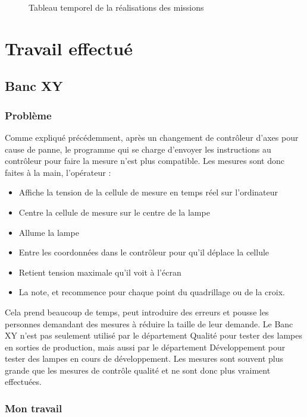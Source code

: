 \documentclass[12pt]{article}
\begin{document}
\begin{figure}[h]
	\centering
	\caption{Tableau temporel de la réalisations des missions}
	\label{fig:planning}
\end{figure}
\newpage

\section{Travail effectué}

\subsection{Banc XY}

\subsubsection{Problème}

Comme expliqué précédemment, après un changement de contrôleur d'axes pour cause de panne, le programme qui se charge d'envoyer les instructions au contrôleur pour faire la mesure n'est plus compatible.
Les mesures sont donc faites à la main, l'opérateur :
\begin{itemize}
		\label{etapesMesureBancXY}

	\item Affiche la tension de la cellule de mesure en temps réel sur l'ordinateur
	\item Centre la cellule de mesure sur le centre de la lampe
	\item Allume la lampe
	\item Entre les coordonnées dans le contrôleur pour qu'il déplace la cellule
	\item Retient tension maximale qu'il voit à l'écran
	\item La note, et recommence pour chaque point du quadrillage ou de la croix.
\end{itemize}
Cela prend beaucoup de temps, peut introduire des erreurs et pousse les personnes demandant des mesures à réduire la taille de leur demande.
Le Banc XY n'est pas seulement utilisé par le département Qualité pour tester des lampes en sorties de production, mais aussi par le département Développement pour tester des lampes en cours de développement.
Les mesures sont souvent plus grande que les mesures de contrôle qualité et ne sont donc plus vraiment effectuées.

\subsubsection{Mon travail}
\end{document}
